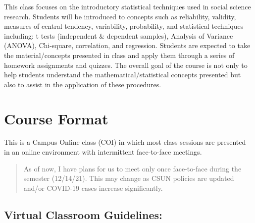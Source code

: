 \documentclass[11pt,]{article}
\begin{document}
This class focuses on the introductory statistical techniques used in
social science research. Students will be introduced to concepts such as
reliability, validity, measures of central tendency, variability,
probability, and statistical techniques including: t tests (independent
\& dependent samples), Analysis of Variance (ANOVA), Chi-square,
correlation, and regression. Students are expected to take the
material/concepts presented in class and apply them through a series of
homework assignments and quizzes. The overall goal of the course is not
only to help students understand the mathematical/statistical concepts
presented but also to assist in the application of these procedures.

\hypertarget{course-format}{%
\section{Course Format}\label{course-format}}

This is a Campus Online class (COI) in which most class sessions are
presented in an online environment with intermittent face-to-face
meetings.

\begin{quote}
As of now, I have plans for us to meet only once face-to-face during the
semester (12/14/21). This may change as CSUN policies are updated and/or
COVID-19 cases increase significantly.
\end{quote}

\hypertarget{virtual-classroom-guidelines}{%
\subsection{Virtual Classroom
Guidelines:}\label{virtual-classroom-guidelines}}
\end{document}
